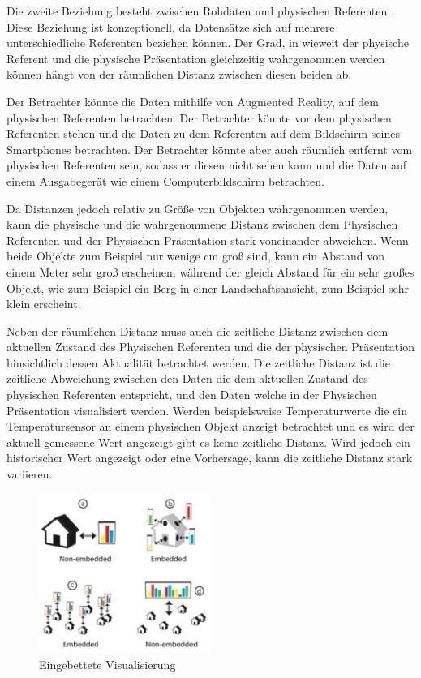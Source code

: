 Die zweite Beziehung besteht zwischen Rohdaten und physischen Referenten . Diese Beziehung ist konzeptionell, da Datensätze sich auf mehrere unterschiedliche Referenten beziehen können. 
Der Grad, in wieweit der physische Referent und die physische Präsentation gleichzeitig wahrgenommen werden können hängt von der räumlichen Distanz zwischen diesen beiden ab. 

Der Betrachter könnte die Daten mithilfe von Augmented Reality, auf dem physischen Referenten betrachten. Der Betrachter könnte vor dem physischen Referenten stehen und die Daten zu dem Referenten auf
dem Bildschirm seines Smartphones betrachten. Der Betrachter könnte aber auch räumlich entfernt vom physischen Referenten sein, sodass er diesen nicht sehen kann und die Daten auf einem Ausgabegerät 
wie einem Computerbildschirm betrachten. 

\cite[S.~194]{ElSayedNevenA.M.BruceH.ThomasRossT.Smith2015} Da Distanzen jedoch relativ zu Größe von Objekten wahrgenommen werden, kann die physische und die wahrgenommene Distanz zwischen dem Physischen Referenten und der Physischen Präsentation stark voneinander abweichen. Wenn beide Objekte zum Beispiel nur wenige cm groß sind, kann ein Abstand von einem Meter sehr groß erscheinen, während der gleich Abstand für ein sehr großes Objekt, wie zum Beispiel ein Berg in einer Landschaftsansicht, zum Beispiel sehr klein erscheint. 

\cite{WesleyWillettYvonneJansen} Neben der räumlichen Distanz muss auch die zeitliche Distanz zwischen dem aktuellen Zustand des Physischen Referenten und die der physischen Präsentation hinsichtlich dessen 
Aktualität betrachtet werden. 
Die zeitliche Distanz ist die zeitliche Abweichung zwischen den Daten die dem aktuellen Zustand des physischen Referenten entspricht, und den Daten welche in der Physischen Präsentation visualisiert werden.
Werden beispielsweise Temperaturwerte die ein Temperatursensor an einem physischen Objekt anzeigt betrachtet und es wird der aktuell gemessene Wert angezeigt gibt es keine zeitliche Distanz. Wird jedoch ein
historischer Wert angezeigt oder eine Vorhersage, kann die zeitliche Distanz stark variieren.

\begin{figure}[H]
	\centering
	\includegraphics[width=0.5\textwidth]{resources/fundamentals/situated_visualization/embedded_visualization.png}
	\caption{Eingebettete Visualisierung \cite{example_embedded_visualization_concept}}
	\label{img:embedded_visualization}
\end{figure}

